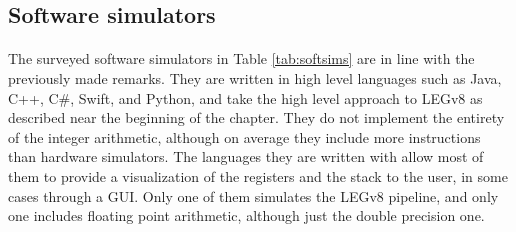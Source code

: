 \begin{landscape}
\begin{table}[H]
	\centering
	\caption{The surveyed hardware simulators}
        \label{tab:harsims}
\end{table}
\end{landscape}
\newpage

\subsection{Software simulators}
\paragraph{}
The surveyed software simulators in Table \ref{tab:softsims} are in line with the previously made remarks. They are written in high level languages such as Java, C++, C\#, Swift, and Python, and take the high level approach to LEGv8 as described near the beginning of the chapter. They do not implement the entirety of the integer arithmetic, although on average they include more instructions than hardware simulators. The languages they are written with allow most of them to provide a visualization of the registers and the stack to the user, in some cases through a GUI. Only one of them simulates the LEGv8 pipeline, and only one includes floating point arithmetic, although just the double precision one.

